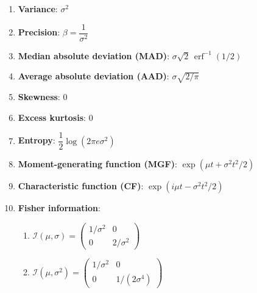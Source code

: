 \begin{enumerate}
    \item
    \textbf{Variance}:
    $ {\displaystyle \sigma ^{2}} $
    \hfill\cite{wiki/Normal_distribution}

    \item
    \textbf{Precision}: $\beta = \dfrac{1}{\sigma^2}$
    \hfill \cite{ml/book/Pattern-Recognition-And-Machine-Learning/Christopher-M-Bishop}

    \item
    \textbf{Median absolute deviation (MAD)}:
    $ {\displaystyle \sigma {\sqrt {2}}\,\operatorname {erf} ^{-1}(1/2)} $
    \hfill\cite{wiki/Normal_distribution}

    \item
    \textbf{Average absolute deviation (AAD)}:
    $ {\textstyle \sigma {\sqrt {2/\pi }}} $
    \hfill\cite{wiki/Normal_distribution}

    \item
    \textbf{Skewness}: $0$
    \hfill\cite{wiki/Normal_distribution}

    \item
    \textbf{Excess kurtosis}: $0$
    \hfill\cite{wiki/Normal_distribution}

    \item
    \textbf{Entropy}: $ {\textstyle {\dfrac {1}{2}}\log(2\pi e\sigma ^{2})} $
    \hfill\cite{wiki/Normal_distribution}

    \item
    \textbf{Moment-generating function (MGF)}: $ {\displaystyle \exp(\mu t+\sigma ^{2}t^{2}/2)} $
    \hfill\cite{wiki/Normal_distribution}

    \item
    \textbf{Characteristic function (CF)}: $ {\displaystyle \exp(i\mu t-\sigma ^{2}t^{2}/2)} $
    \hfill\cite{wiki/Normal_distribution}

    \item
    \textbf{Fisher information}:
    \begin{enumerate}
        \item ${\displaystyle {\mathcal {I}}(\mu ,\sigma )={\begin{pmatrix}1/\sigma ^{2}&0\\0&2/\sigma ^{2}\end{pmatrix}}}$

        \item ${\displaystyle {\mathcal {I}}(\mu ,\sigma ^{2})={\begin{pmatrix}1/\sigma ^{2}&0\\0&1/(2\sigma ^{4})\end{pmatrix}}}$
    \end{enumerate}
    \hfill\cite{wiki/Normal_distribution}


\end{enumerate}

